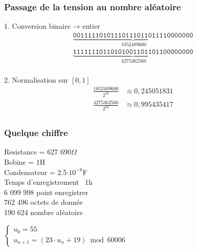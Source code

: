     \begin{frame}
        \frametitle{Passage de la tension au nombre aléatoire}

        \small

        \begin{block}{1. Conversion binaire → entier}
        \[
        \begin{aligned}
        \underbrace{\texttt{00111110101110111011011110000000}}_{\;1052489600} \\
        \underbrace{\texttt{11111110110101001101101100000000}}_{\;4275362560} \\
        \end{aligned}
        \]
        \end{block}

        \vspace{0.3cm}

        \begin{block}{2. Normalisation sur $[0,1]$}
        \[
        \begin{aligned}
        \frac{1052489600}{2^{32}} &\approx 0{,}245051831 \\
        \frac{4275362560}{2^{32}} &\approx 0{,}995435417 \\
        \end{aligned}
        \]
        \end{block}
    \end{frame}


    \begin{frame}
        \frametitle{Quelque chiffre}
        \begin{center}
            Resistance = 627 690$\Omega$
            \\
            Bobine = 1H
            \\
            Condensateur = 2.5$\cdot 10^{-8}$F
            \\
            Temps d'enregistrement ~1h
            \\
            6 099 998 point enregistrer
            \\
            762 496 octets de donnée
            \\
            190 624 nombre aléatoire
        \end{center}
    \end{frame}
    $
    \begin{cases}
    u_0 = 55\\
    u_{n+1} = (23 \cdot u_n + 19) \bmod 60006 
    \end{cases}
    $